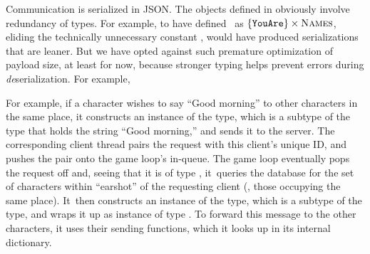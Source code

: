 
Communication is serialized in JSON\@. The objects defined
in  obviously involve redundancy of types. For
example, to have defined \youarevalset\ as
$\{ \texttt{YouAre} \} \times \textsc{Names} $, eliding the technically
unnecessary constant \charnametg, would have produced serializations
that are leaner. But we have opted against such premature optimization
of payload size, at least for now, because stronger typing helps
prevent errors during {\em de}serialization. For example,

For example, if a character wishes to say ``Good morning'' to other
characters in the same place, it constructs an instance of
the  type, which is a subtype of the  type that
holds the string ``Good morning,'' and sends it to the server.  The
corresponding client thread pairs the request with this client's
unique ID, and pushes the pair onto the game loop's in-queue.  The
game loop eventually pops the request off and, seeing that it is of
type , it~queries the database for the set of characters
within ``earshot'' of the requesting client (\ie, those occupying the
same place).  It~then constructs an instance of the
 type, which is a subtype of the  type, and wraps it up
as instance of type .
To forward this message to the other characters, it uses their sending
functions, which it looks up in its internal dictionary.

